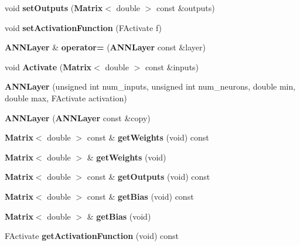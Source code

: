 \begin{DoxyCompactItemize}
\item 
void {\bfseries set\+Outputs} ({\bf Matrix}$<$ double $>$ const \&outputs)\label{class_g_a_n_n_1_1_a_n_n_layer_a7249be13922695f54aa3ed0b888584b8}

\item 
void {\bfseries set\+Activation\+Function} (F\+Activate f)\label{class_g_a_n_n_1_1_a_n_n_layer_afee60047b0ccb6d2b92f75d4b55febdc}

\item 
{\bf A\+N\+N\+Layer} \& {\bfseries operator=} ({\bf A\+N\+N\+Layer} const \&layer)\label{class_g_a_n_n_1_1_a_n_n_layer_a2b22cd2b08de3d0b41615dd6be0198d4}

\item 
void {\bfseries Activate} ({\bf Matrix}$<$ double $>$ const \&inputs)\label{class_g_a_n_n_1_1_a_n_n_layer_aa8388e643e0916ad8366bb8abc227331}

\item 
{\bfseries A\+N\+N\+Layer} (unsigned int num\+\_\+inputs, unsigned int num\+\_\+neurons, double min, double max, F\+Activate activation)\label{class_g_a_n_n_1_1_a_n_n_layer_a98a15401495eddad363a75c2ab9c5773}

\item 
{\bfseries A\+N\+N\+Layer} ({\bf A\+N\+N\+Layer} const \&copy)\label{class_g_a_n_n_1_1_a_n_n_layer_a89236bd33096986ab0efa417d4cbcb1c}

\item 
{\bf Matrix}$<$ double $>$ const \& {\bfseries get\+Weights} (void) const \label{class_g_a_n_n_1_1_a_n_n_layer_ab2ccaae743a40f1f39595f983db22a8d}

\item 
{\bf Matrix}$<$ double $>$ \& {\bfseries get\+Weights} (void)\label{class_g_a_n_n_1_1_a_n_n_layer_abd06bed4090d09e09669e9ff56b4659a}

\item 
{\bf Matrix}$<$ double $>$ const \& {\bfseries get\+Outputs} (void) const \label{class_g_a_n_n_1_1_a_n_n_layer_a47fbef47e9c7c0ef638aed2a2bd30974}

\item 
{\bf Matrix}$<$ double $>$ const \& {\bfseries get\+Bias} (void) const \label{class_g_a_n_n_1_1_a_n_n_layer_a23a78b0d4255e3480872ba6df6562290}

\item 
{\bf Matrix}$<$ double $>$ \& {\bfseries get\+Bias} (void)\label{class_g_a_n_n_1_1_a_n_n_layer_a2814de885892bd51d23d157fb7ff53a9}

\item 
F\+Activate {\bfseries get\+Activation\+Function} (void) const \label{class_g_a_n_n_1_1_a_n_n_layer_a17a2ecad13a3aac38329470e8575ed62}


\end{DoxyCompactItemize}
